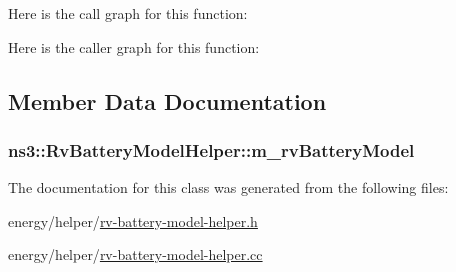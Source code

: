 Here is the call graph for this function\+:




Here is the caller graph for this function\+:




\subsection{Member Data Documentation}
\subsubsection[{\texorpdfstring{m\+\_\+rv\+Battery\+Model}{m_rvBatteryModel}}]{ ns3\+::\+Rv\+Battery\+Model\+Helper\+::m\+\_\+rv\+Battery\+Model\hspace{0.3cm}{\ttfamily [private]}}\hypertarget{classns3_1_1RvBatteryModelHelper_a9721419b5b8c97f3a0c886c4b0b647ba}{}\label{classns3_1_1RvBatteryModelHelper_a9721419b5b8c97f3a0c886c4b0b647ba}


The documentation for this class was generated from the following files\+:\begin{DoxyCompactItemize}
\item 
energy/helper/\hyperlink{rv-battery-model-helper_8h}{rv-\/battery-\/model-\/helper.\+h}\item 
energy/helper/\hyperlink{rv-battery-model-helper_8cc}{rv-\/battery-\/model-\/helper.\+cc}\end{DoxyCompactItemize}
